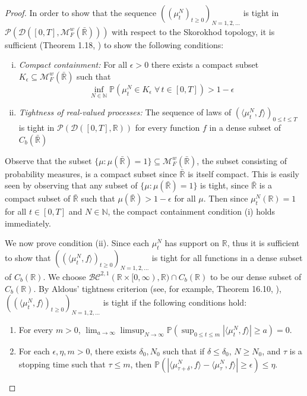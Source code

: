 \documentclass{article}
\newcommand{\B}[1]{\mathbb{#1}}
\newcommand{\C}[1]{\mathcal{#1}}
\begin{document}
\begin{proof}
    In order to show that the sequence $((\mu_t^N)_{t\geq 0})_{N=1,2,\ldots}$ is tight in $\C{P}(\C{D}([0,T],\C{M}^w_F(\bar{\B{R}})))$ with respect to the Skorokhod topology, it is sufficient (Theorem 1.18, \cite{etheridge}) to show the following conditions:
    \begin{enumerate}[(i)]
        \item \textit{Compact containment:} For all $\epsilon > 0$ there exists a compact subset $K_\epsilon\subseteq \C{M}_F^w(\bar{\B{R}})$ such that $$\inf_{N\in \B{N}} \B{P}(\mu_t^N \in K_\epsilon\;  \forall \, t\in [0,T])>1-\epsilon$$
        \item \textit{Tightness of real-valued processes:} The sequence of laws of $(\langle \mu_t^N,f\rangle)_{0\leq t\leq T}$ is tight in $\C{P}(\C{D}([0,T],\B{R}))$ for every function $f$ in a dense subset of $C_b(\bar{\B{R}})$
    \end{enumerate}
    
    Observe that the subset $\{\mu:\mu(\bar{\B{R}})=1\}\subseteq \C{M}_F^w(\bar{\B{R}})$, the subset consisting of probability measures, is a compact subset since $\bar{\B{R}}$ is itself compact. This is easily seen by observing that any subset of $\{\mu:\mu(\bar{\B{R}})=1\}$ is tight, since $\bar{\B{R}}$ is a compact subset of $\bar{\B{R}}$ such that $\mu(\bar{\B{R}})>1-\epsilon$ for all $\mu$. Then since $\mu_t^N(\B{R})=1$ for all $t\in [0,T]$ and $N\in \B{N}$, the compact containment condition (i) holds immediately. 
    
    We now prove condition (ii). Since each $\mu_t^N$ has support on $\B{R}$, thus it is sufficient to show that $((\langle \mu_t^N,f\rangle)_{t\geq 0})_{N=1,2,\ldots}$ is tight for all functions in a dense subset of $C_b(\B{R})$. We choose $\C{BC}^{2,1}(\B{R}\times [0,\infty),\B{R})\cap C_b(\B{R})$ to be our dense subset of $C_b(\B{R})$. By Aldous' tightness criterion (see, for example, Theorem 16.10, \cite{billingsley}), $((\langle \mu_t^N,f\rangle)_{t\geq 0})_{N=1,2,\ldots}$ is tight if the following conditions hold:
    \begin{enumerate}[A]
        \item For every $m>0$, $\lim_{a\to\infty}\limsup_{N\to\infty}\B{P}(\sup_{0\leq t\leq m}|\langle \mu_t^N,f\rangle|\geq a)=0$.
        \item For each $\epsilon, \eta, m >0$, there exists $\delta_0, N_0$ such that if $\delta \leq \delta_0$, $N\geq N_0$, and $\tau$ is a stopping time such that $\tau\leq m$, then $\B{P}(|\langle \mu_{\tau+\delta}^N,f\rangle-\langle \mu^N_{\tau},f\rangle|\geq \epsilon)\leq \eta$.
    \end{enumerate}


\end{proof}
\end{document}
